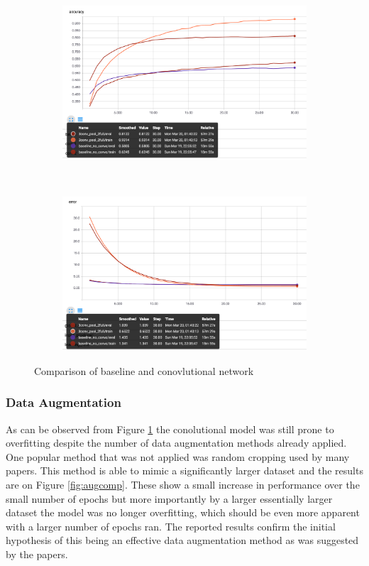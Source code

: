 \documentclass[12pt]{article}
\begin{document}
\begin{figure}[ht!]
    \centering
    \begin{subfigure}[t]{0.475\textwidth}
        \centering
        \includegraphics[width=1.0\linewidth]{netcompa.png}
    \end{subfigure}%
    ~ 
    \begin{subfigure}[t]{0.475\textwidth}
        \centering
        \includegraphics[width=1.0\linewidth]{netcompe.png}
    \end{subfigure}
    \caption{Comparison of baseline and conovlutional network}
    \label{fig:netcomp}
\end{figure}

\subsubsection*{Data Augmentation}

As can be observed from Figure \ref{fig:netcomp} the conolutional model was still prone to overfitting despite the number of data augmentation methods already applied. One popular method that was not applied was random cropping used by many papers\cite{kernel}\cite{crop}. This method is able to mimic a significantly larger dataset and the results are on Figure \ref{fig:augcomp}. These show a small increase in performance over the small number of epochs but more importantly by a larger essentially larger dataset the model was no longer overfitting, which should be even more apparent with a larger number of epochs ran. The reported results confirm the initial hypothesis of this being an effective data augmentation method as was suggested by the papers.
\end{document}
